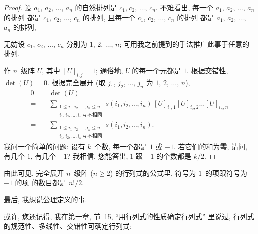 \documentclass[%
    UTF8,%
    fontset=none,%
    punct=kaiming,%
    zihao=-4,%
    a4paper,%
    oneside,%
]{ctexbook}
\renewcommand*{\leq}{\leqslant}
\renewcommand*{\geq}{\geqslant}
\begin{document}
\begin{proof}
    设 \(a_1\), \(a_2\), \(\dots\), \(a_n\)
    的自然排列是 \(c_1\), \(c_2\), \(\dots\), \(c_n\).
    不难看出,
    每一个 \(a_1\), \(a_2\), \(\dots\), \(a_n\) 的排列%
    都是 \(c_1\), \(c_2\), \(\dots\), \(c_n\) 的排列,
    且每一个 \(c_1\), \(c_2\), \(\dots\), \(c_n\) 的排列%
    都是 \(a_1\), \(a_2\), \(\dots\), \(a_n\) 的排列,

    无妨设 \(c_1\), \(c_2\), \(\dots\), \(c_n\)
    分别为 \(1\), \(2\), \(\dots\), \(n\);
    可用我之前提到的手法推广此事于任意的排列.

    作 \(n\)~级阵 \(U\),
    其中 \([U]_{i,j} = 1\);
    通俗地, \(U\) 的每一个元都是 \(1\).
    根据交错性, \(\det {(U)} = 0\).
    根据完全展开
    (取 \(j_1\), \(j_2\), \(\dots\), \(j_n\)
    为 \(1\), \(2\), \(\dots\), \(n\)),
    \begin{align*}
        0
        = {} & \det {(U)}
        \\
        = {} & \sum_{\substack{
        1 \leq i_1, i_2, \dots, i_n \leq n \\
                i_1, i_2, \dots, i_n\,\text{互不相同}
            }}
        {s(i_1, i_2, \dots, i_n)\,
            [U]_{i_1,1} [U]_{i_2,2} \dots [U]_{i_n,n}}
        \\
        = {} & \sum_{\substack{
        1 \leq i_1, i_2, \dots, i_n \leq n \\
                i_1, i_2, \dots, i_n\,\text{互不相同}
            }}
        {s(i_1, i_2, \dots, i_n)}.
    \end{align*}
    我问一个简单的问题:
    设有 \(k\)~个数, 每一个都是 \(1\) 或 \(-1\).
    若它们的和为零, 请问, 有几个 \(1\), 有几个 \(-1\)?
    我相信, 您能答出,
    \(1\) 跟 \(-1\) 的个数都是 \(k/2\).
\end{proof}

由此可见,
完全展开 \(n\)~级阵 (\(n \geq 2\)) 的行列式的公式里,
符号为 \(1\)~的项跟符号为 \(-1\) 的项%
的数目都是 \(n!/2\).

\vspace{2ex}

最后, 我想说公理定义的事.

或许, 您还记得,
我在第一章, 节~15,
``用行列式的性质确定行列式'' 里说过,
行列式的规范性、多线性、交错性可确定行列式:
\end{document}
